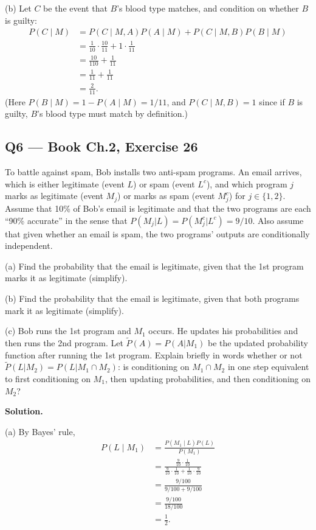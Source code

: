 \documentclass[11pt]{article}
\begin{document}
(b) Let $C$ be the event that $B$'s blood type matches, and condition on whether $B$ is guilty:
\begin{align*}
P(C\mid M) &= P(C\mid M, A)P(A\mid M) + P(C\mid M, B)P(B\mid M) \\
&= \frac{1}{10}\cdot \frac{10}{11} + 1 \cdot \frac{1}{11} \\
&= \frac{10}{110} + \frac{1}{11} \\
&= \frac{1}{11} + \frac{1}{11} \\
&= \frac{2}{11}.
\end{align*}
(Here $P(B\mid M) = 1 - P(A\mid M) = 1/11$, and $P(C\mid M, B) = 1$ since if $B$ is guilty, $B$'s blood type must match by definition.)

\subsection*{Q6 --- Book Ch.2, Exercise 26}
\begin{qbox}
To battle against spam, Bob installs two anti-spam programs. An email arrives, which is either legitimate (event $L$) or spam (event $L^c$), and which program $j$ marks as legitimate (event $M_j$) or marks as spam (event $M_j^c$) for $j \in \{1,2\}$. Assume that 10\% of Bob's email is legitimate and that the two programs are each ``90\% accurate'' in the sense that $P(M_j|L) = P(M_j^c|L^c) = 9/10$. Also assume that given whether an email is spam, the two programs' outputs are conditionally independent.

(a) Find the probability that the email is legitimate, given that the 1st program marks it as legitimate (simplify).

(b) Find the probability that the email is legitimate, given that both programs mark it as legitimate (simplify).

(c) Bob runs the 1st program and $M_1$ occurs. He updates his probabilities and then runs the 2nd program. Let $\tilde P(A) = P(A|M_1)$ be the updated probability function after running the 1st program. Explain briefly in words whether or not $\tilde P(L|M_2) = P(L|M_1 \cap M_2)$: is conditioning on $M_1 \cap M_2$ in one step equivalent to first conditioning on $M_1$, then updating probabilities, and then conditioning on $M_2$?
\end{qbox}
\textbf{Solution.}

(a) By Bayes' rule,
\begin{align*}
P(L\mid M_1) &= \frac{P(M_1\mid L)P(L)}{P(M_1)} \\
&= \frac{\tfrac{9}{10}\cdot \tfrac{1}{10}}{\tfrac{9}{10}\cdot \tfrac{1}{10} + \tfrac{1}{10}\cdot \tfrac{9}{10}} \\
&= \frac{9/100}{9/100 + 9/100} \\
&= \frac{9/100}{18/100} \\
&= \frac{1}{2}.
\end{align*}
\end{document}
